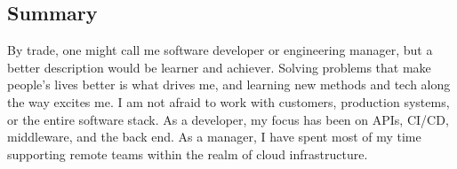 \documentclass[margin,line]{resume}
\begin{document}
\address{https://github.com/crashenx $\bullet$ (618) 530-0659 $\bullet$ jesse@compile.fail}
\begin{resume}

\section{Summary}

{\small By trade, one might call me software developer or engineering manager, but a better description
would be learner and achiever. Solving problems that make people's lives better is what drives me, and learning
new methods and tech along the way excites me. I am not afraid to work with customers, production systems,
or the entire software stack. As a developer, my focus has been on APIs, CI/CD, middleware, and the back end. As a
manager, I have spent most of my time supporting remote teams within the realm of cloud infrastructure.}



\end{resume}
\end{document}
